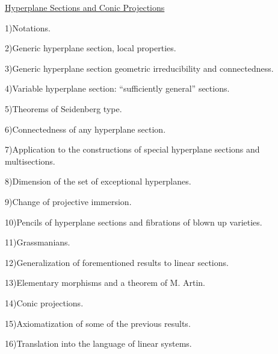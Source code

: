 
\uline{Hyperplane Sections and Conic Projections}

1)\quad Notations.

2)\quad Generic hyperplane section, local properties.

3)\quad Generic hyperplane section geometric irreducibility and
connectedness.

4)\quad Variable hyperplane section: ``sufficiently general''
sections.

5)\quad Theorems of Seidenberg type.

6)\quad Connectedness of any hyperplane section.

7)\quad Application to the constructions of special hyperplane
sections and multisections.

8)\quad Dimension of the set of exceptional hyperplanes.

9)\quad Change of projective immersion.

10)\quad Pencils of hyperplane sections and fibrations of blown up
varieties.

11)\quad Grassmanians.

12)\quad Generalization of forementioned results to linear sections.

13)\quad Elementary morphisms and a theorem of M. Artin.

14)\quad Conic projections.

15)\quad Axiomatization of some of the previous results.

16)\quad Translation into the language of linear systems.
